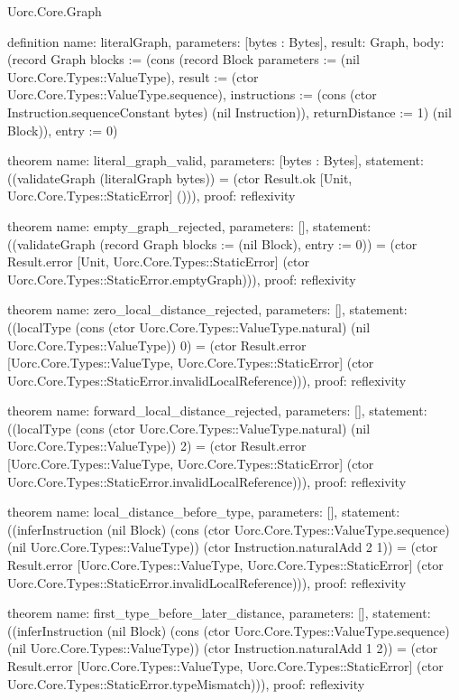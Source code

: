 \begin{lexlean}{Uorc.Core.Graph}
\begin{semanticmodule}
definition{
  name: literalGraph,
  parameters: [bytes : Bytes],
  result: Graph,
  body: (record Graph {blocks := (cons (record Block {parameters := (nil Uorc.Core.Types::ValueType), result := (ctor Uorc.Core.Types::ValueType.sequence), instructions := (cons (ctor Instruction.sequenceConstant bytes) (nil Instruction)), returnDistance := 1}) (nil Block)), entry := 0})
}

theorem{
  name: literal_graph_valid,
  parameters: [bytes : Bytes],
  statement: ((validateGraph (literalGraph bytes)) = (ctor Result.ok [Unit, Uorc.Core.Types::StaticError] ())),
  proof: reflexivity{}
}

theorem{
  name: empty_graph_rejected,
  parameters: [],
  statement: ((validateGraph (record Graph {blocks := (nil Block), entry := 0})) = (ctor Result.error [Unit, Uorc.Core.Types::StaticError] (ctor Uorc.Core.Types::StaticError.emptyGraph))),
  proof: reflexivity{}
}

theorem{
  name: zero_local_distance_rejected,
  parameters: [],
  statement: ((localType (cons (ctor Uorc.Core.Types::ValueType.natural) (nil Uorc.Core.Types::ValueType)) 0) = (ctor Result.error [Uorc.Core.Types::ValueType, Uorc.Core.Types::StaticError] (ctor Uorc.Core.Types::StaticError.invalidLocalReference))),
  proof: reflexivity{}
}

theorem{
  name: forward_local_distance_rejected,
  parameters: [],
  statement: ((localType (cons (ctor Uorc.Core.Types::ValueType.natural) (nil Uorc.Core.Types::ValueType)) 2) = (ctor Result.error [Uorc.Core.Types::ValueType, Uorc.Core.Types::StaticError] (ctor Uorc.Core.Types::StaticError.invalidLocalReference))),
  proof: reflexivity{}
}

theorem{
  name: local_distance_before_type,
  parameters: [],
  statement: ((inferInstruction (nil Block) (cons (ctor Uorc.Core.Types::ValueType.sequence) (nil Uorc.Core.Types::ValueType)) (ctor Instruction.naturalAdd 2 1)) = (ctor Result.error [Uorc.Core.Types::ValueType, Uorc.Core.Types::StaticError] (ctor Uorc.Core.Types::StaticError.invalidLocalReference))),
  proof: reflexivity{}
}

theorem{
  name: first_type_before_later_distance,
  parameters: [],
  statement: ((inferInstruction (nil Block) (cons (ctor Uorc.Core.Types::ValueType.sequence) (nil Uorc.Core.Types::ValueType)) (ctor Instruction.naturalAdd 1 2)) = (ctor Result.error [Uorc.Core.Types::ValueType, Uorc.Core.Types::StaticError] (ctor Uorc.Core.Types::StaticError.typeMismatch))),
  proof: reflexivity{}
}


\end{semanticmodule}
\end{lexlean}
